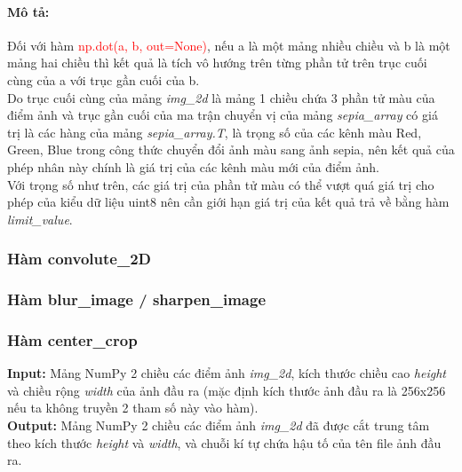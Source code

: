 \documentclass{article}
\begin{document}
\paragraph{Mô tả:}
Đối với hàm \textcolor{red}{np.dot(a, b, out=None)}, nếu a là một mảng nhiều chiều và b là một mảng hai chiều thì kết quả là tích vô hướng trên từng phần tử trên trục cuối cùng của a với trục gần cuối của b.\\
Do trục cuối cùng của mảng \textit{img\_2d} là mảng 1 chiều chứa 3 phần tử màu của điểm ảnh và trục gần cuối của ma trận chuyển vị của mảng \textit{sepia\_array} có giá trị là các hàng của mảng \textit{sepia\_array.T}, là trọng số của các kênh màu Red, Green, Blue trong công thức chuyển đổi ảnh màu sang ảnh sepia, nên kết quả của phép nhân này chính là giá trị của các kênh màu mới của điểm ảnh.\\
Với trọng số như trên, các giá trị của phần tử màu có thể vượt quá giá trị cho phép của kiểu dữ liệu uint8 nên cần giới hạn giá trị của kết quả trả về bằng hàm \textit{limit\_value}.

\subsubsection{Hàm convolute\_2D}
\subsubsection{Hàm blur\_image / sharpen\_image}

\subsubsection{Hàm center\_crop}
\textbf{Input:} Mảng NumPy 2 chiều các điểm ảnh \textit{img\_2d}, kích thước chiều cao \textit{height} và chiều rộng \textit{width} của ảnh đầu ra (mặc định kích thước ảnh đầu ra là 256x256 nếu ta không truyền 2 tham số này vào hàm). \\
\textbf{Output:} Mảng NumPy 2 chiều các điểm ảnh \textit{img\_2d} đã được cắt trung tâm theo kích thước \textit{height} và \textit{width}, và chuỗi kí tự chứa hậu tố của tên file ảnh đầu ra. \\
\end{document}
